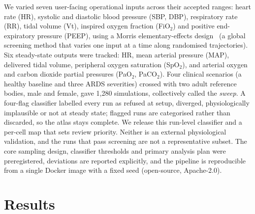 \documentclass[pdflatex,sn-nature]{sn-jnl}%
\begin{document}
We varied seven user-facing operational inputs across their accepted ranges: heart rate (HR), systolic and diastolic blood pressure (SBP, DBP), respiratory rate (RR), tidal volume (Vt), inspired oxygen fraction (FiO$_2$) and positive end-expiratory pressure (PEEP), using a Morris elementary-effects design~\cite{morris1991,campolongo2007} (a global screening method that varies one input at a time along randomised trajectories). Six steady-state outputs were tracked: HR, mean arterial pressure (MAP), delivered tidal volume, peripheral oxygen saturation (SpO$_2$), and arterial oxygen and carbon dioxide partial pressures (PaO$_2$, PaCO$_2$). Four clinical scenarios (a healthy baseline and three ARDS severities) crossed with two adult reference bodies, male and female, gave 1{,}280 simulations, collectively called the \emph{sweep}. A four-flag classifier labelled every run as refused at setup, diverged, physiologically implausible or not at steady state; flagged runs are categorised rather than discarded, so the atlas stays complete. We release this run-level classifier and a per-cell map that sets review priority. Neither is an external physiological validation, and the runs that pass screening are not a representative subset. The core sampling design, classifier thresholds and primary analysis plan were preregistered, deviations are reported explicitly, and the pipeline is reproducible from a single Docker image with a fixed seed (open-source, Apache-2.0).

\section{Results}\label{sec:results}
\end{document}
